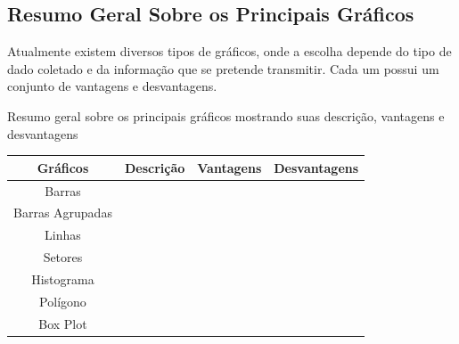 \newpage


\subsection{Resumo Geral Sobre os Principais Gráficos}

\inic Atualmente existem diversos tipos de gráficos, onde a escolha depende do tipo de dado coletado e da informação que se pretende transmitir. Cada um possui um conjunto de vantagens e desvantagens.      

\begin{quadro}[h!tp]
    \centering
    \caption{Resumo geral sobre os principais gráficos mostrando suas descrição, vantagens e desvantagens}
    \begin{tabular}{|c|c|c|c|}
   \hline\hline
    Gráficos       & Descrição &  Vantagens & Desvantagens \\   
\hline\hline
  Barras           &           &           &             \\
  Barras Agrupadas &           &           &              \\
  Linhas           &           &           &              \\  
  Setores          &           &           &              \\
  Histograma       &           &           &              \\
  Polígono         &           &           &              \\
  Box Plot         &           &           &              \\
\hline\hline
\end{tabular}
\end{quadro}










